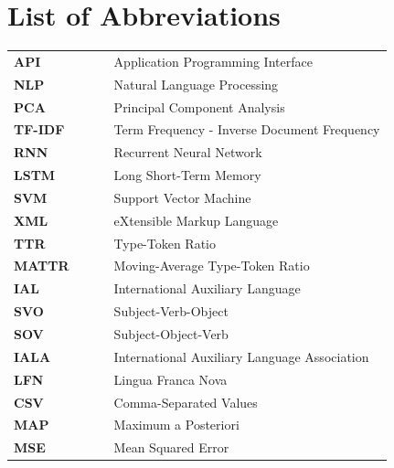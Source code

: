 \documentclass[12pt,a4paper]{article}
\numberwithin{figure}{section}
\numberwithin{table}{section}
\numberwithin{definition}{section}
\begin{document}
\section*{List of Abbreviations}

\begin{tabular}{lcl}
\textbf{API} & ~~~ & Application Programming Interface \\
\textbf{NLP} & ~~~ & Natural Language Processing \\
\textbf{PCA} & ~~~ & Principal Component Analysis \\
\textbf{TF-IDF} & ~~~ & Term Frequency - Inverse Document Frequency \\
\textbf{RNN} & ~~~ & Recurrent Neural Network \\
\textbf{LSTM} & ~~~ & Long Short-Term Memory \\
\textbf{SVM} & ~~~ & Support Vector Machine \\
\textbf{XML} & ~~~ & eXtensible Markup Language \\
\textbf{TTR} & ~~~ & Type-Token Ratio \\
\textbf{MATTR} & ~~~ & Moving-Average Type-Token Ratio \\
\textbf{IAL} & ~~~ & International Auxiliary Language \\
\textbf{SVO} & ~~~ & Subject-Verb-Object \\
\textbf{SOV} & ~~~ & Subject-Object-Verb \\
\textbf{IALA} & ~~~ & International Auxiliary Language Association \\
\textbf{LFN} & ~~~ & Lingua Franca Nova \\
\textbf{CSV} & ~~~ & Comma-Separated Values \\
\textbf{MAP} & ~~~ & Maximum a Posteriori \\
\textbf{MSE} & ~~~ & Mean Squared Error \\


\end{tabular}
\newpage


\pagestyle{fancy}
\fancyhf{}
\fancyhead[L]{\textcolor{gray}{\slshape\nouppercase{\rightmark}}}
\fancyhead[R]{\thepage}
\fancyfoot[R]{\textcolor{gray}{Seminar für Sprachwissenschaft Universität Tübingen}}
\renewcommand{\headrulewidth}{0.4pt}

\renewcommand{\headrulewidth}{0.5pt}
\renewcommand{\footrulewidth}{0.5pt}
\end{document}
